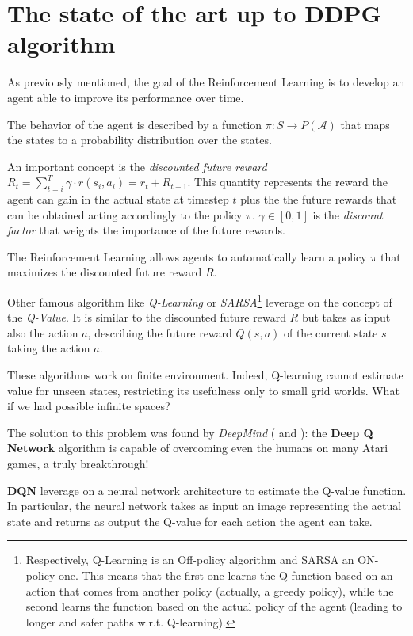 \documentclass[10pt,a4paper]{scrartcl}
\begin{document}
\section{The state of the art up to DDPG algorithm}

As 	previously mentioned, the goal of the Reinforcement Learning is to develop an agent able to improve its performance over time.
 
The behavior of the agent is described by a function $ \pi:S \rightarrow P(\mathcal{A}) $ that maps the states to a probability distribution over the states. 

An important concept is the \textit{discounted future reward} $ R_t = \sum_{t=i}^{T} \gamma \cdot r(s_i, a_i) = r_t + R_{t+1} $. This quantity represents the reward the agent can gain in the actual state at timestep $ t $ plus the the future rewards that can be obtained acting accordingly to the policy $ \pi $. $ \gamma \in [0,1]$ is the \textit{discount factor} that weights the importance of the future rewards.

The Reinforcement Learning allows agents to automatically learn a policy $ \pi $ that maximizes the discounted future reward $ R $.

Other famous algorithm like \textit{Q-Learning} or \textit{SARSA}\footnote{Respectively, Q-Learning is an Off-policy algorithm and SARSA an ON-policy one. This means that the first one learns the Q-function based on an action that comes from another policy (actually, a greedy policy), while the second learns the function based on the actual policy of the agent (leading to longer and safer paths w.r.t. Q-learning).} leverage on the concept of the \textit{Q-Value}. It is similar to the discounted future reward $ R $ but takes as input also the action $ a $, describing the future reward $ Q(s,a) $ of the current state $ s $ taking the action $ a $. 

These algorithms work on finite environment. Indeed, Q-learning cannot estimate value for unseen states, restricting its usefulness only to small grid worlds. What if we had possible infinite spaces?

The solution to this problem was found by \textit{DeepMind} (\cite{Mnih2013PlayingAW} and \cite{mnih2015humanlevel}): the \textbf{Deep Q Network} algorithm is capable of overcoming even the humans on many Atari games, a truly breakthrough!

\textbf{DQN} leverage on a neural network architecture to estimate the Q-value function. In particular, the neural network takes as input an image representing the actual state and returns as output the Q-value for each action the agent can take.
\end{document}
